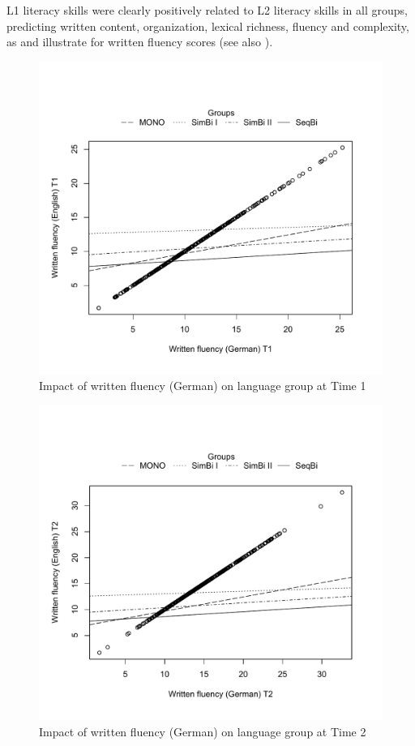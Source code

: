 \documentclass[output=paper,modfonts,nonflat,newtxmath]{langsci/langscibook}
\begin{document}
L1 literacy skills were clearly positively related to L2 literacy skills in all groups, predicting written content, organization, lexical richness, fluency and complexity, as  and  illustrate for written fluency scores (see also \citealt{Pfenninger2014}).


\begin{figure}%
\includegraphics[height=.45\textheight]{figures/PfenningerFigure7.pdf}
\caption{\label{fig:pfenninger:7}Impact of written fluency (German) on language group at Time 1}
\end{figure}

\begin{figure}%
\includegraphics[height=.45\textheight]{figures/PfenningerFigure8.pdf}
\caption{\label{fig:pfenninger:8} Impact of written fluency (German) on language group at Time 2}
\end{figure}
\end{document}

